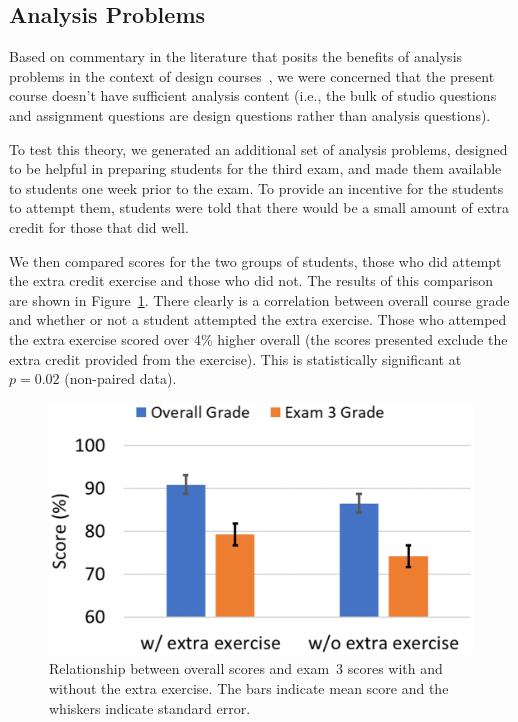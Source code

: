 \subsection{Analysis Problems}

Based on commentary in the literature that posits the benefits of analysis problems in the context of design courses~\cite{wjbo01}, we were concerned that the present course doesn't have sufficient analysis content (i.e., the bulk of studio questions and assignment questions are design questions rather than analysis questions).

To test this theory, we generated an additional set of analysis problems, designed to be helpful in preparing students for the third exam, and made them available to students one week prior to the exam.  To provide an incentive for the students to attempt them, students were told that there would be a small amount of extra credit for those that did well.

We then compared scores for the two groups of students, those who did attempt the extra credit exercise and those who did not.  The results of this comparison are shown in Figure~\ref{fig:scores}. There clearly is a correlation between overall course grade and whether or not a student attempted the extra exercise. Those who attemped the extra exercise scored over 4\% higher overall (the scores presented exclude the extra credit provided from the exercise).  This is statistically significant at $p = 0.02$ (non-paired data).

\begin{figure}[ht]
\centering
\includegraphics[width=\columnwidth]{scores}
\caption{Relationship between overall scores and exam~3 scores
with and without the extra exercise. The bars indicate mean score and
the whiskers indicate standard error.}
\label{fig:scores}
\end{figure}

